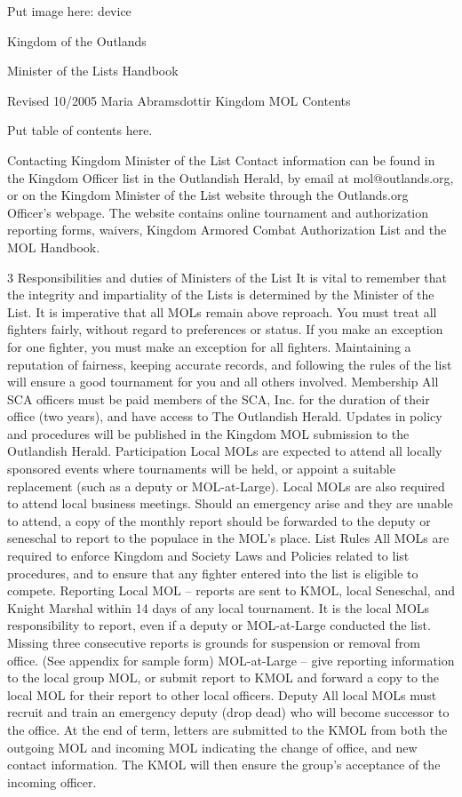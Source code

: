 \documentclass{article}
\begin{document}
Put image here: device


Kingdom of the Outlands

Minister of the Lists
Handbook

Revised 10/2005
Maria Abramsdottir
Kingdom MOL
Contents

Put table of contents here.

Contacting Kingdom Minister of the List
Contact information can be found in the Kingdom Officer list in the Outlandish Herald, by email at
mol@outlands.org, or on the Kingdom Minister of the List website through the Outlands.org
Officer’s webpage. The website contains online tournament and authorization reporting forms,
waivers, Kingdom Armored Combat Authorization List and the MOL Handbook.


3
Responsibilities and duties of Ministers of the List
It is vital to remember that the integrity and impartiality of the Lists is determined by the Minister of the
List. It is imperative that all MOLs remain above reproach. You must treat all fighters fairly, without
regard to preferences or status. If you make an exception for one fighter, you must make an exception
for all fighters. Maintaining a reputation of fairness, keeping accurate records, and following the rules
of the list will ensure a good tournament for you and all others involved.
Membership All SCA officers must be paid members of the SCA, Inc. for the duration of their office
(two years), and have access to The Outlandish Herald. Updates in policy and procedures
will be published in the Kingdom MOL submission to the Outlandish Herald.
Participation Local MOLs are expected to attend all locally sponsored events where tournaments will be
held, or appoint a suitable replacement (such as a deputy or MOL-at-Large). Local MOLs
are also required to attend local business meetings. Should an emergency arise and they
are unable to attend, a copy of the monthly report should be forwarded to the deputy or
seneschal to report to the populace in the MOL’s place.
List Rules All MOLs are required to enforce Kingdom and Society Laws and Policies related to list
procedures, and to ensure that any fighter entered into the list is eligible to compete.
Reporting Local MOL – reports are sent to KMOL, local Seneschal, and Knight Marshal within 14
days of any local tournament. It is the local MOLs responsibility to report, even if a deputy
or MOL-at-Large conducted the list. Missing three consecutive reports is grounds for
suspension or removal from office. (See appendix for sample form)
MOL-at-Large – give reporting information to the local group MOL, or submit report to
KMOL and forward a copy to the local MOL for their report to other local officers.
Deputy All local MOLs must recruit and train an emergency deputy (drop dead) who will become
successor to the office. At the end of term, letters are submitted to the KMOL from both
the outgoing MOL and incoming MOL indicating the change of office, and new contact
information. The KMOL will then ensure the group’s acceptance of the incoming officer.
\end{document}
